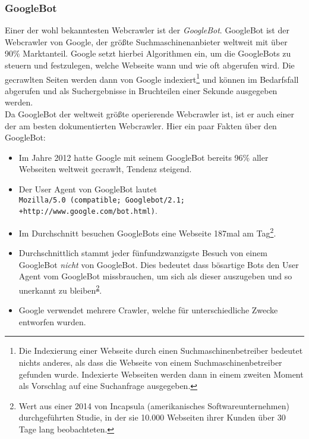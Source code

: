 \subsubsection{GoogleBot}
Einer der wohl bekanntesten Webcrawler ist der \emph{GoogleBot}. GoogleBot ist der Webcrawler von Google, der größte Suchmaschinenanbieter weltweit mit über 90\% Marktanteil\cite{google-marktanteil}. Google setzt hierbei Algorithmen ein, um die GoogleBots zu steuern und festzulegen, welche Webseite wann und wie oft abgerufen wird\cite{googlebot-googleconsole}. Die gecrawlten Seiten werden dann von Google indexiert\footnote{Die Indexierung einer Webseite durch einen Suchmaschinenbetreiber bedeutet nichts anderes, als dass die Webseite von einem Suchmaschinenbetreiber gefunden wurde. Indexierte Webseiten werden dann in einem zweiten Moment als Vorschlag auf eine Suchanfrage ausgegeben\cite{was-ist-indexieren}.} und können im Bedarfsfall abgerufen und als Suchergebnisse in Bruchteilen einer Sekunde ausgegeben werden.\\
Da GoogleBot der weltweit größte operierende Webcrawler ist, ist er auch einer der am besten dokumentierten Webcrawler. Hier ein paar Fakten über den GoogleBot:
\begin{itemize}
	\item Im Jahre 2012 hatte Google mit seinem GoogleBot bereits 96\%\cite{googlebot-facts-percentage} aller Webseiten weltweit gecrawlt, Tendenz steigend. 
	\item Der User Agent von GoogleBot lautet\\\texttt{Mozilla/5.0 (compatible; Googlebot/2.1;\\+http://www.google.com/bot.html)}\cite{googlebot-user-agent}. 
	\item Im Durchschnitt besuchen GoogleBots eine Webseite 187mal am Tag\cite{googlebot-facts-incapsula}\footnote{\label{footnote:incapsula-studie}Wert aus einer 2014 von Incapsula (amerikanisches Softwareunternehmen) durchgeführten Studie, in der sie 10.000 Webseiten ihrer Kunden über 30 Tage lang beobachteten.}.
	\item Durchschnittlich stammt jeder fünfundzwanzigste Besuch von einem GoogleBot \emph{nicht} von GoogleBot. Dies bedeutet dass bösartige Bots den User Agent vom GoogleBot missbrauchen, um sich als dieser auszugeben und so unerkannt zu bleiben\cite{googlebot-facts-incapsula}\textsuperscript{\ref{footnote:incapsula-studie}}.
	\item Google verwendet mehrere Crawler, welche für unterschiedliche Zwecke entworfen wurden\cite{googlebot-user-agent}.
\end{itemize}
\label{subsub:googlebot}

